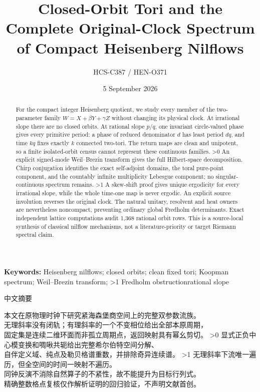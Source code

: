 \documentclass[10pt]{article}
\title{Closed-Orbit Tori and the Complete Original-Clock Spectrum\\
of Compact Heisenberg Nilflows}
\author{HCS-C387 / HEN-O371}
\date{5 September 2026}
\begin{document}
\maketitle
\begin{abstract}
For the compact integer Heisenberg quotient, we study every member of the
two-parameter family $W=X+\beta Y+\gamma Z$ without changing its physical
clock. At irrational slope there are no closed orbits. At rational slope
$p/q$, one invariant circle-valued phase gives every primitive period:
a phase of reduced denominator $d$ has least period $dq$, and time $kq$
fixes exactly $k$ connected two-tori. The return maps are clean and unipotent,
so a finite isolated-orbit census cannot represent these continuous families.
\ifnum\CRevisionRound>0
An explicit signed-mode Weil--Brezin transform gives the full Hilbert-space
decomposition. Chirp conjugation identifies the exact self-adjoint domains,
the toral pure-point component, and the countably infinite multiplicity
Lebesgue component; no singular-continuous spectrum remains.
\fi
\ifnum\CRevisionRound>1
A skew-shift proof gives unique ergodicity for every irrational slope,
while the whole time-one map is never ergodic. An explicit source involution
reverses the original clock. The natural unitary, resolvent and heat owners
are nevertheless noncompact, preventing ordinary global Fredholm
determinants. Exact independent lattice computations audit 1,368 rational
orbit rows. This is a source-local synthesis of classical nilflow mechanisms,
not a literature-priority or target Riemann spectral claim.
\fi
\end{abstract}
\noindent\textbf{Keywords:} Heisenberg nilflows; closed orbits; clean fixed tori;
Koopman spectrum; Weil--Brezin transform; \ifnum\CRevisionRound>1 Fredholm obstruction\else rational slope\fi

\begin{center}{\zhfont\large 中文摘要}\end{center}
{\zhfont\begin{flushleft}
本文在原物理时钟下研究紧海森堡商空间上的完整双参数流族。\\
无理斜率没有闭轨；有理斜率的一个不变相位给出全部本原周期，\\
固定集是连续二维环面而非孤立周期点，返回映射具有幂幺剪切。
\ifnum\CRevisionRound>0
显式正负中心模变换和啁啾共轭给出完整希尔伯特空间分解、\\
自伴定义域、纯点及勒贝格谱重数，并排除奇异连续谱。
\fi
\ifnum\CRevisionRound>1
无理斜率下流唯一遍历，但全空间的时间一映射不遍历。\\
同钟反演不消除自然算子的不紧性，故不能提升为目标行列式。\\
精确整数格点复核仅作解析证明的回归验证，不声明文献首创。
\fi
\end{flushleft}}
\end{document}
